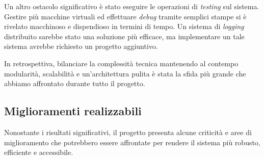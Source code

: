 Un altro ostacolo significativo è stato eseguire le operazioni di \textit{testing} sul sistema. Gestire più 
macchine virtuali ed effettuare \textit{debug} tramite semplici stampe  
si è rivelato macchinoso e dispendioso in termini di tempo. Un sistema di \textit{logging} distribuito sarebbe 
stato una 
soluzione più efficace, ma implementare un tale sistema avrebbe richiesto un progetto aggiuntivo.

In retrospettiva, bilanciare la complessità tecnica mantenendo al contempo modularità, scalabilità e 
un'architettura pulita è stata la sfida più grande che abbiamo affrontato durante tutto il progetto.

\subsection{Miglioramenti realizzabili}
Nonostante i risultati significativi, il progetto presenta alcune criticità e aree di miglioramento che 
potrebbero essere affrontate per rendere il sistema più robusto, efficiente e accessibile.
